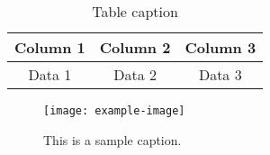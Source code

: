 \documentclass[12pt]{article} %
\begin{document}
\begin{table}[h]
    \centering
    \begin{tabular}{|c|c|c|}
    \hline
    Column 1 & Column 2 & Column 3 \\ \hline
    Data 1 & Data 2 & Data 3 \\ \hline
    \end{tabular}
    \caption{Table caption}
\end{table}

\begin{figure}[h]
    \centering
    \texttt{[image: example-image]} %
    \caption{This is a sample caption.}
    \label{fig:example}
\end{figure}
\end{document}
